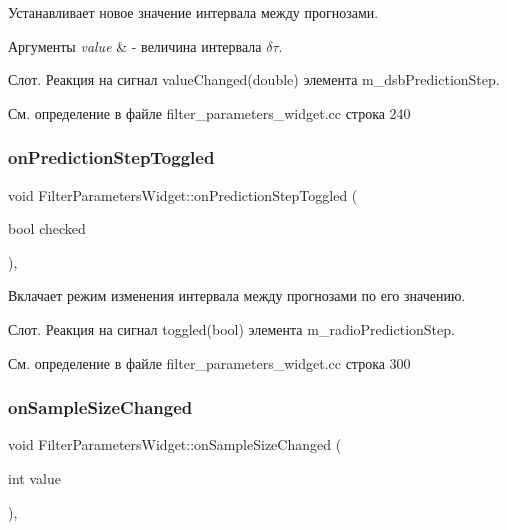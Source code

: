 Устанавливает новое значение интервала между прогнозами. 


\begin{DoxyParams}{Аргументы}
{\em value} & -\/ величина интервала $\delta \tau$.\\
\hline
\end{DoxyParams}
Слот. Реакция на сигнал value\+Changed(double) элемента m\+\_\+dsb\+Prediction\+Step. 

См. определение в файле filter\+\_\+parameters\+\_\+widget.\+cc строка 240

\hypertarget{class_filter_parameters_widget_aa5168232b5731eafd599c451fd9a54f9}{}\label{class_filter_parameters_widget_aa5168232b5731eafd599c451fd9a54f9} 
\subsubsection{\texorpdfstring{on\+Prediction\+Step\+Toggled}{onPredictionStepToggled}}
{\footnotesize\ttfamily void Filter\+Parameters\+Widget\+::on\+Prediction\+Step\+Toggled (\begin{DoxyParamCaption}\item[{bool}]{checked }\end{DoxyParamCaption})\hspace{0.3cm}{\ttfamily [private]}, {\ttfamily [slot]}}



Вклачает режим изменения интервала между прогнозами по его значению. 

Слот. Реакция на сигнал toggled(bool) элемента m\+\_\+radio\+Prediction\+Step. 

См. определение в файле filter\+\_\+parameters\+\_\+widget.\+cc строка 300

\hypertarget{class_filter_parameters_widget_afc9adb2c97bb297c29a86c2e9ee123b5}{}\label{class_filter_parameters_widget_afc9adb2c97bb297c29a86c2e9ee123b5} 
\subsubsection{\texorpdfstring{on\+Sample\+Size\+Changed}{onSampleSizeChanged}}
{\footnotesize\ttfamily void Filter\+Parameters\+Widget\+::on\+Sample\+Size\+Changed (\begin{DoxyParamCaption}\item[{int}]{value }\end{DoxyParamCaption})\hspace{0.3cm}{\ttfamily [private]}, {\ttfamily [slot]}}



